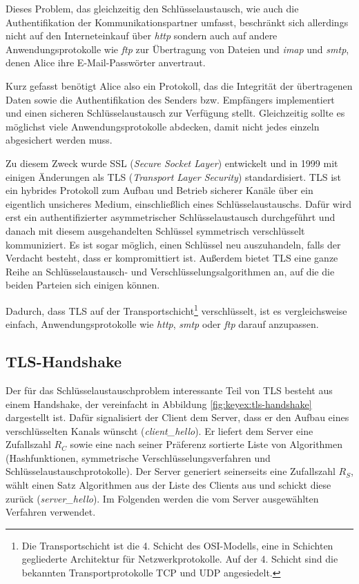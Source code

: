 Dieses Problem, das gleichzeitig den Schlüsselaustausch, wie auch die Authentifikation der Kommunikationspartner umfasst, beschränkt sich allerdings nicht auf
den Interneteinkauf über \emph{http} sondern auch auf andere Anwendungsprotokolle wie \emph{ftp} zur Übertragung von Dateien und \emph{imap} und \emph{smtp},
denen Alice ihre E-Mail-Passwörter anvertraut.

Kurz gefasst benötigt Alice also ein Protokoll, das die Integrität der übertragenen Daten sowie die Authentifikation des Senders bzw. Empfängers implementiert
und einen sicheren Schlüsselaustausch zur Verfügung stellt. Gleichzeitig sollte es möglichst viele Anwendungsprotokolle abdecken, damit nicht jedes einzeln
abgesichert werden muss.

Zu diesem Zweck wurde SSL (\emph{Secure Socket Layer}) entwickelt und in 1999 mit einigen Änderungen als TLS (\emph{Transport Layer Security}) standardisiert.
TLS ist ein hybrides Protokoll zum Aufbau und Betrieb sicherer Kanäle über ein eigentlich unsicheres Medium, einschließlich eines Schlüsselaustauschs.
Dafür wird erst ein authentifizierter asymmetrischer Schlüsselaustausch durchgeführt und danach mit diesem ausgehandelten Schlüssel symmetrisch
verschlüsselt kommuniziert. Es ist sogar möglich, einen Schlüssel neu auszuhandeln, falls der Verdacht besteht, dass er kompromittiert
ist. Außerdem bietet TLS eine ganze Reihe an Schlüsselaustausch- und Verschlüsselungsalgorithmen an, auf die die beiden Parteien sich
einigen können.

Dadurch, dass TLS auf der Transportschicht\footnote{Die Transportschicht ist die 4. Schicht des OSI-Modells, eine in Schichten gegliederte Architektur für Netzwerkprotokolle. Auf der 4. Schicht sind die bekannten Transportprotokolle TCP und UDP angesiedelt.} verschlüsselt, ist es vergleichsweise einfach, Anwendungsprotokolle wie \emph{http}, \emph{smtp} oder \emph{ftp}
darauf anzupassen.

\subsection{TLS-Handshake}
Der für das Schlüsselaustauschproblem interessante Teil von TLS besteht aus einem Handshake, der vereinfacht in Abbildung \ref{fig:keyex:tls-handshake}
dargestellt ist.
Dafür signalisiert der Client dem Server, dass er den Aufbau eines verschlüsselten Kanals wünscht (\emph{client\_hello}). Er liefert
dem Server eine Zufallszahl $R_C$ sowie eine nach seiner Präferenz sortierte Liste von Algorithmen (Hashfunktionen, symmetrische
Verschlüsselungsverfahren und Schlüsselaustauschprotokolle). Der Server generiert seinerseits eine Zufallszahl $R_S$, wählt einen Satz
Algorithmen aus der Liste des Clients aus und schickt diese zurück (\emph{server\_hello}). Im Folgenden werden die vom Server ausgewählten
Verfahren verwendet.

